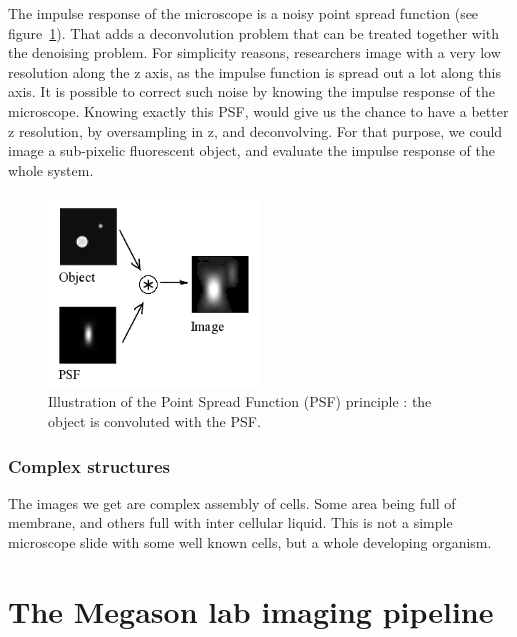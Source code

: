 The impulse response of the microscope is a noisy point spread function (see figure~\ref{fig:pointSpreadPrinciple}).
That adds a deconvolution problem that can be treated together with the denoising problem.
For simplicity reasons, researchers image with a very low resolution along the z axis, as the impulse function is spread out a lot along this axis.
It is possible to correct such noise by knowing the impulse response of the microscope.
Knowing exactly this PSF, would give us the chance to have a better z resolution, by oversampling in z, and deconvolving.
For that purpose, we could image a sub-pixelic fluorescent object, and evaluate the impulse response of the whole system.
\begin{figure}[htb]
\begin{center}
\leavevmode
\includegraphics[width=0.5\textwidth]{pictures/pointSpreadFunction}
\end{center}
\caption{Illustration of the Point Spread Function (PSF) principle : the object is convoluted with the PSF.}
\label{fig:pointSpreadPrinciple}
\end{figure}


\subsubsection{Complex structures}

The images we get are complex assembly of cells.
Some area being full of membrane, and others full with inter cellular liquid.
This is not a simple microscope slide with some well known cells, but a whole developing organism.



\section{The Megason lab imaging pipeline}

